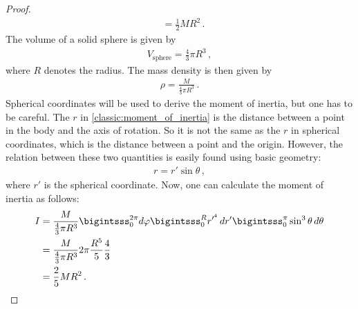 \begin{example}
\begin{mdframed}[roundcorner=10pt, linecolor=blue, linewidth=1pt]
\begin{proof}[Proof]
\begin{align}
                    &= \frac{1}{2}MR^2\,.
                \end{align}
                The volume of a solid sphere is given by
                \begin{gather}
                    V_{\text{sphere}} = \frac{4}{3}\pi R^3\,,
                \end{gather}
                where $R$ denotes the radius. The mass density is then given by
                \begin{gather}
                    \rho = \frac{M}{\frac{4}{3}\pi R^3}\,.
                \end{gather}
                Spherical coordinates will be used to derive the moment of inertia, but one has to be careful. The $r$ in \cref{classic:moment_of_inertia} is the distance between a point in the body and the axis of rotation. So it is not the same as the $r$ in spherical coordinates, which is the distance between a point and the origin. However, the relation between these two quantities is easily found using basic geometry:
                \begin{gather}
                    r=r'\sin\theta\,,
                \end{gather}
                where $r'$ is the spherical coordinate. Now, one can calculate the moment of inertia as follows:
                \begin{align}
                    I &= \frac{M}{\frac{4}{3}\pi R^3}\bigintsss_0^{2\pi}d\varphi\bigintsss_0^Rr'^{^4}\,dr'\bigintsss_0^\pi\sin^3\theta\,d\theta\nonumber\\
                    &= \frac{M}{\frac{4}{3}\pi R^3} 2\pi\frac{R^5}{5}\frac{4}{3}\nonumber\\
                    &= \frac{2}{5}MR^2\,.
                \end{align}
            \end{proof}
        \end{mdframed}
    \end{example}


